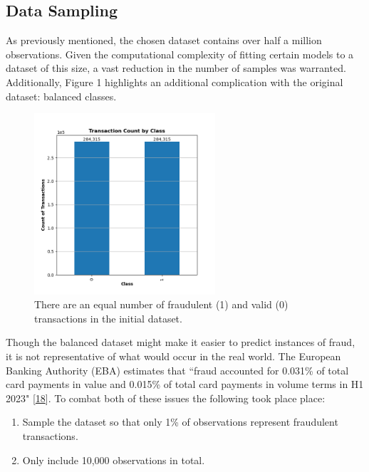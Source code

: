 \documentclass[11pt, oneside]{article}   	%
\begin{document}


\subsection{Data Sampling}

As previously mentioned, the chosen dataset contains over half a million observations. Given the computational complexity of fitting certain models to a dataset of this size, a vast reduction in the number of samples was warranted. Additionally, Figure 1 highlights an additional complication with the original dataset: balanced classes. 

\begin{figure}[h!]
    \centering
    \includegraphics[width=0.6\textwidth]{figures/fig_1.png}
    \captionsetup{font=small} 
    \caption{There are an equal number of fraudulent (1) and valid (0) transactions in the initial dataset.}
    \label{fig1}
\end{figure}

Though the balanced dataset might make it easier to predict instances of fraud, it is not representative of what would occur in the real world. The European Banking Authority (EBA) estimates that ``fraud accounted for 0.031\% of total card payments in value and 0.015\% of total card payments in volume terms in H1 2023" [\href{https://www.eba.europa.eu/sites/default/files/2024-08/465e3044-4773-4e9d-8ca8-b1cd031295fc/EBA_ECB\%202024\%20Report\%20on\%20Payment\%20Fraud.pdf}{18}]. To combat both of these issues the following took place place:

\begin{enumerate}
	\item{Sample the dataset so that only 1\% of observations represent fraudulent transactions.}
	\item{Only include 10,000 observations in total.}
\end{enumerate}
\end{document}
